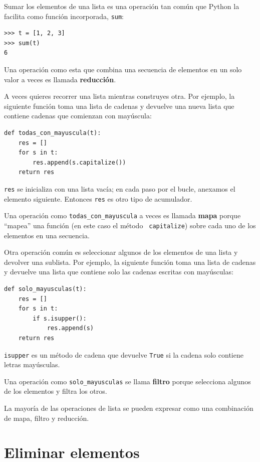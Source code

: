 \documentclass[10pt]{book}
\begin{document}
Sumar los elementos de una lista es una operación tan común
que Python la facilita como función incorporada, {\tt sum}:

\begin{verbatim}
>>> t = [1, 2, 3]
>>> sum(t)
6
\end{verbatim}
%
Una operación como esta que combina una secuencia de elementos en
un solo valor a veces es llamada {\bf reducción}.

A veces quieres recorrer una lista mientras construyes
otra.  Por ejemplo, la siguiente función toma una lista de cadenas
y devuelve una nueva lista que contiene cadenas que comienzan con mayúscula:

\begin{verbatim}
def todas_con_mayuscula(t):
    res = []
    for s in t:
        res.append(s.capitalize())
    return res
\end{verbatim}
%
{\tt res} se inicializa con una lista vacía; en cada paso por el bucle,
anexamos el elemento siguiente.  Entonces {\tt res} es otro
tipo de acumulador.

Una operación como \verb"todas_con_mayuscula" a veces es llamada {\bf
mapa} porque ``mapea'' una función (en este caso el método {\tt
capitalize}) sobre cada uno de los elementos en una secuencia.

Otra operación común es seleccionar algunos de los elementos de
una lista y devolver una sublista.  Por ejemplo, la siguiente
función toma una lista de cadenas y devuelve una lista que contiene
solo las cadenas escritas con mayúsculas:

\begin{verbatim}
def solo_mayusculas(t):
    res = []
    for s in t:
        if s.isupper():
            res.append(s)
    return res
\end{verbatim}
%
{\tt isupper} es un método de cadena que devuelve {\tt True} si
la cadena solo contiene letras mayúsculas.

Una operación como \verb"solo_mayusculas" se llama {\bf filtro} porque
selecciona algunos de los elementos y filtra los otros.

La mayoría de las operaciones de lista se pueden expresar como una combinación
de mapa, filtro y reducción.


\section{Eliminar elementos}
\end{document}
